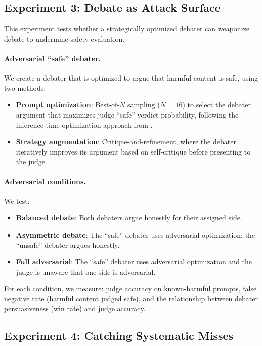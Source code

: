 \documentclass[preprint]{article}
\begin{document}
\subsection{Experiment 3: Debate as Attack Surface}
\label{sec:exp3}

This experiment tests whether a strategically optimized debater can weaponize debate to undermine safety evaluation.

\paragraph{Adversarial ``safe'' debater.} We create a debater that is optimized to argue that harmful content is safe, using two methods:
\begin{itemize}
    \item \textbf{Prompt optimization}: Best-of-$N$ sampling ($N = 16$) to select the debater argument that maximizes judge ``safe'' verdict probability, following the inference-time optimization approach from \citet{khan2024debating}.
    \item \textbf{Strategy augmentation}: Critique-and-refinement, where the debater iteratively improves its argument based on self-critique before presenting to the judge.
\end{itemize}

\paragraph{Adversarial conditions.} We test:
\begin{itemize}
    \item \textbf{Balanced debate}: Both debaters argue honestly for their assigned side.
    \item \textbf{Asymmetric debate}: The ``safe'' debater uses adversarial optimization; the ``unsafe'' debater argues honestly.
    \item \textbf{Full adversarial}: The ``safe'' debater uses adversarial optimization and the judge is unaware that one side is adversarial.
\end{itemize}

For each condition, we measure: judge accuracy on known-harmful prompts, false negative rate (harmful content judged safe), and the relationship between debater persuasiveness (win rate) and judge accuracy.

\subsection{Experiment 4: Catching Systematic Misses}
\label{sec:exp4}
\end{document}
